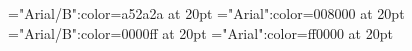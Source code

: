 \documentclass{article}
\begin{document}
 
\thispagestyle{empty} 
\font\tdtbta="Arial/B":color=a52a2a at 20pt
\font\tctbta="Arial":color=008000 at 20pt
\font\tbta="Arial/B":color=0000ff at 20pt
\font\ta="Arial":color=ff0000 at 20pt






\end{document}
